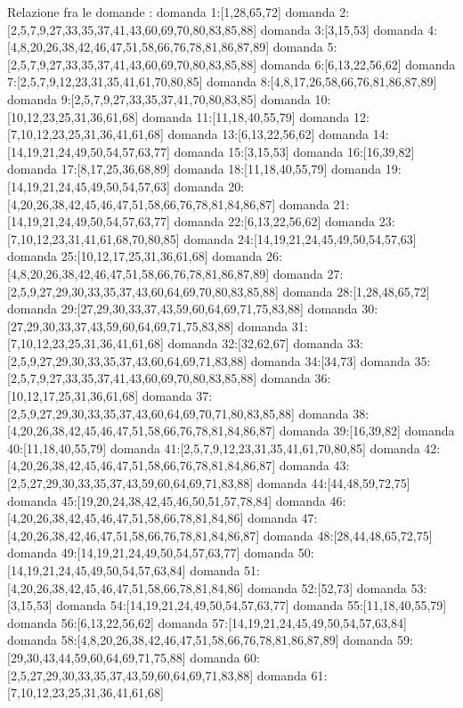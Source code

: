 Relazione fra le domande :
domanda 1:[1,28,65,72]
domanda 2:[2,5,7,9,27,33,35,37,41,43,60,69,70,80,83,85,88]
domanda 3:[3,15,53]
domanda 4:[4,8,20,26,38,42,46,47,51,58,66,76,78,81,86,87,89]
domanda 5:[2,5,7,9,27,33,35,37,41,43,60,69,70,80,83,85,88]
domanda 6:[6,13,22,56,62]
domanda 7:[2,5,7,9,12,23,31,35,41,61,70,80,85]
domanda 8:[4,8,17,26,58,66,76,81,86,87,89]
domanda 9:[2,5,7,9,27,33,35,37,41,70,80,83,85]
domanda 10:[10,12,23,25,31,36,61,68]
domanda 11:[11,18,40,55,79]
domanda 12:[7,10,12,23,25,31,36,41,61,68]
domanda 13:[6,13,22,56,62]
domanda 14:[14,19,21,24,49,50,54,57,63,77]
domanda 15:[3,15,53]
domanda 16:[16,39,82]
domanda 17:[8,17,25,36,68,89]
domanda 18:[11,18,40,55,79]
domanda 19:[14,19,21,24,45,49,50,54,57,63]
domanda 20:[4,20,26,38,42,45,46,47,51,58,66,76,78,81,84,86,87]
domanda 21:[14,19,21,24,49,50,54,57,63,77]
domanda 22:[6,13,22,56,62]
domanda 23:[7,10,12,23,31,41,61,68,70,80,85]
domanda 24:[14,19,21,24,45,49,50,54,57,63]
domanda 25:[10,12,17,25,31,36,61,68]
domanda 26:[4,8,20,26,38,42,46,47,51,58,66,76,78,81,86,87,89]
domanda 27:[2,5,9,27,29,30,33,35,37,43,60,64,69,70,80,83,85,88]
domanda 28:[1,28,48,65,72]
domanda 29:[27,29,30,33,37,43,59,60,64,69,71,75,83,88]
domanda 30:[27,29,30,33,37,43,59,60,64,69,71,75,83,88]
domanda 31:[7,10,12,23,25,31,36,41,61,68]
domanda 32:[32,62,67]
domanda 33:[2,5,9,27,29,30,33,35,37,43,60,64,69,71,83,88]
domanda 34:[34,73]
domanda 35:[2,5,7,9,27,33,35,37,41,43,60,69,70,80,83,85,88]
domanda 36:[10,12,17,25,31,36,61,68]
domanda 37:[2,5,9,27,29,30,33,35,37,43,60,64,69,70,71,80,83,85,88]
domanda 38:[4,20,26,38,42,45,46,47,51,58,66,76,78,81,84,86,87]
domanda 39:[16,39,82]
domanda 40:[11,18,40,55,79]
domanda 41:[2,5,7,9,12,23,31,35,41,61,70,80,85]
domanda 42:[4,20,26,38,42,45,46,47,51,58,66,76,78,81,84,86,87]
domanda 43:[2,5,27,29,30,33,35,37,43,59,60,64,69,71,83,88]
domanda 44:[44,48,59,72,75]
domanda 45:[19,20,24,38,42,45,46,50,51,57,78,84]
domanda 46:[4,20,26,38,42,45,46,47,51,58,66,78,81,84,86]
domanda 47:[4,20,26,38,42,46,47,51,58,66,76,78,81,84,86,87]
domanda 48:[28,44,48,65,72,75]
domanda 49:[14,19,21,24,49,50,54,57,63,77]
domanda 50:[14,19,21,24,45,49,50,54,57,63,84]
domanda 51:[4,20,26,38,42,45,46,47,51,58,66,78,81,84,86]
domanda 52:[52,73]
domanda 53:[3,15,53]
domanda 54:[14,19,21,24,49,50,54,57,63,77]
domanda 55:[11,18,40,55,79]
domanda 56:[6,13,22,56,62]
domanda 57:[14,19,21,24,45,49,50,54,57,63,84]
domanda 58:[4,8,20,26,38,42,46,47,51,58,66,76,78,81,86,87,89]
domanda 59:[29,30,43,44,59,60,64,69,71,75,88]
domanda 60:[2,5,27,29,30,33,35,37,43,59,60,64,69,71,83,88]
domanda 61:[7,10,12,23,25,31,36,41,61,68]
